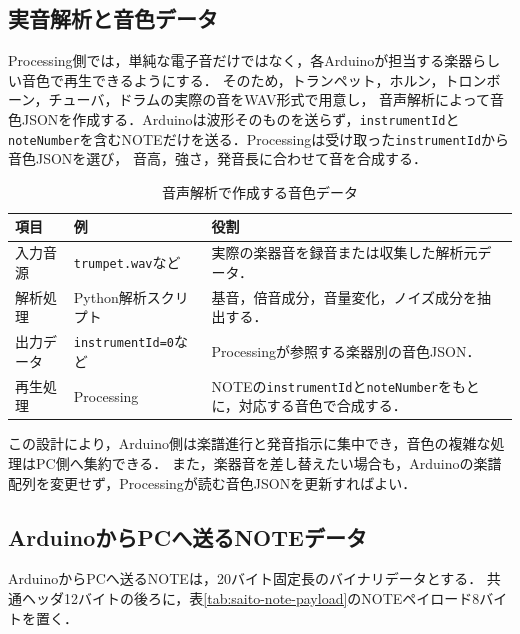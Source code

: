 \documentclass[lualatex,book,paper=a4paper,jafontsize=11.5pt,jafontscale=1.05]{jlreq}
\newcommand{\code}[1]{\texttt{#1}}
\begin{document}
\subsection{実音解析と音色データ}

Processing側では，単純な電子音だけではなく，各Arduinoが担当する楽器らしい音色で再生できるようにする．
そのため，トランペット，ホルン，トロンボーン，チューバ，ドラムの実際の音をWAV形式で用意し，
音声解析によって音色JSONを作成する．Arduinoは波形そのものを送らず，\code{instrumentId}と
\code{noteNumber}を含むNOTEだけを送る．Processingは受け取った\code{instrumentId}から音色JSONを選び，
音高，強さ，発音長に合わせて音を合成する．

\begin{table}[H]
\centering
\caption{音声解析で作成する音色データ}
\label{tab:saito-timbre-data}
\begin{tabular}{p{}p{}p{}}
\toprule
\textbf{項目} & \textbf{例} & \textbf{役割} \\
\midrule
入力音源 & \code{trumpet.wav}など & 実際の楽器音を録音または収集した解析元データ．\\
解析処理 & Python解析スクリプト & 基音，倍音成分，音量変化，ノイズ成分を抽出する．\\
出力データ & \code{instrumentId=0}など & Processingが参照する楽器別の音色JSON．\\
再生処理 & Processing & NOTEの\code{instrumentId}と\code{noteNumber}をもとに，対応する音色で合成する．\\
\bottomrule
\end{tabular}
\end{table}

この設計により，Arduino側は楽譜進行と発音指示に集中でき，音色の複雑な処理はPC側へ集約できる．
また，楽器音を差し替えたい場合も，Arduinoの楽譜配列を変更せず，Processingが読む音色JSONを更新すればよい．

\subsection{ArduinoからPCへ送るNOTEデータ}

ArduinoからPCへ送るNOTEは，20バイト固定長のバイナリデータとする．
共通ヘッダ12バイトの後ろに，表\ref{tab:saito-note-payload}のNOTEペイロード8バイトを置く．
\end{document}
